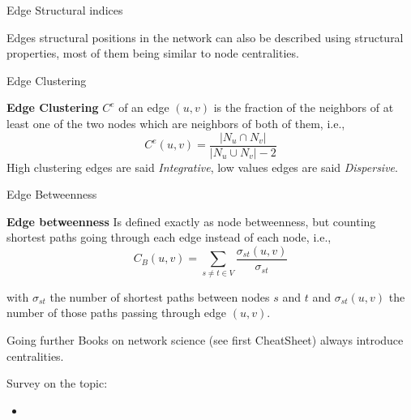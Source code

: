 \documentclass[a4paper,11pt]{book}
\begin{document}
\begin{textbox}{Edge Structural indices}

Edges structural positions in the network can also be described using structural properties, most of them being similar to node centralities.
\end{textbox}

\begin{textbox}{Edge Clustering}


\textbf{Edge Clustering} $C^e$ of an edge $(u,v)$ is the fraction of the neighbors of at least one of the two nodes which are neighbors of both of them, i.e.,
\[
C^e(u,v)=\frac{|N_u \cap N_v|}{|N_u \cup N_v|-2}
\]
High clustering edges are said \textit{Integrative}, low values edges are said \textit{Dispersive}.
\end{textbox}

\begin{textbox}{Edge Betweenness}


\textbf{Edge betweenness} Is defined exactly as node betweenness, but counting shortest paths going through each edge instead of each node, i.e.,
\[ C_{B}(u,v)=\sum _{s\neq t\in V}{\frac {\sigma _{st}(u,v)}{\sigma _{st}}}\]

with $\sigma _{st}$ the number of shortest paths between nodes $s$ and $t$ and $\sigma _{st}(u,v)$ the number of those paths passing through edge $(u,v)$.

\end{textbox}












\begin{textbox}{Going further}
Books on network science (see first CheatSheet) always introduce centralities.

Survey on the topic:
\begin{itemize}
    \item \cite{rodrigues2019network}
\end{itemize}
\end{textbox}





\end{document}
